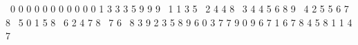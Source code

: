 \documentclass[12pt,twoside]{article}
\begin{document}
\bigskip

~0 {\textbar} 0 0 0 0 0 0 0 0 0 0 1 3 3 3 5 9 9 9\newline
~1 {\textbar} 1 3 5\newline
~2 {\textbar} 4 4 8\newline
~3 {\textbar} 4 4 5 6 8 9\newline
~4 {\textbar} 2 5 5 6 7 8\newline
~5 {\textbar} 0 1 5 8\newline
~6 {\textbar} 2 4 7 8\newline
~7 {\textbar} 6\newline
~8 {\textbar} 3 9 {\textbar} 2 3 5 8 9 {\textbar} 6 {\textbar} 0 3 {\textbar} 7 7 9 {\textbar} 0 9 {\textbar} 6 {\textbar} 7 {\textbar} 1 6 {\textbar} 7 8 {\textbar} 4 5 8 {\textbar} 1 {\textbar} {\textbar} {\textbar} {\textbar} {\textbar} {\textbar} 1 {\textbar} {\textbar} {\textbar} 4 {\textbar} {\textbar} {\textbar} {\textbar} {\textbar} {\textbar} {\textbar} {\textbar} 7 {\textbar} {\textbar}\newline
\end{document}
